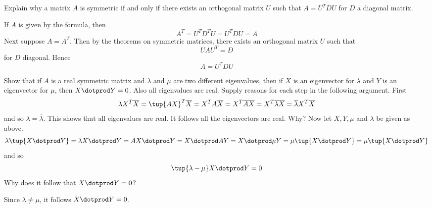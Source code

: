 \begin{enumialphparenastyle}
\begin{ex} Explain why a matrix $A$ is symmetric if and only if there exists an
orthogonal matrix $U$ such that $A=U^{T}DU$ for $D$ a diagonal matrix.
\begin{sol}
If $A$ is given by the formula, then
\[
A^{T}=U^{T}D^{T}U=U^{T}DU=A
\]
Next suppose $A=A^{T}$. Then by the theorems on symmetric matrices, there
exists an orthogonal matrix $U$ such that
\[
UAU^{T}=D
\]
for $D$ diagonal. Hence
\[
A=U^{T}DU
\]
\end{sol}
\end{ex}

\begin{ex} Show that if $A$ is a real symmetric matrix and 
$\lambda $ and $\mu $ are two different eigenvalues, then if $X$ is
an eigenvector for $\lambda $ and $Y$ is an eigenvector for $\mu $,
then $X\dotprod Y=0$. Also all eigenvalues are real. Supply reasons
for each step in the following argument. First 
\begin{equation*}
\lambda X^{T}\overline{X}=\tup{AX} ^{T}
\overline{X}=X^{T}A\overline{X}=X^{T}
\overline{AX}=X^{T}\overline{\lambda }\overline{X}
=\overline{\lambda }X^{T}\overline{X}
\end{equation*}
and so $\lambda =\overline{\lambda }$. This shows that all eigenvalues are
real. It follows all the eigenvectors are real. Why? Now let $X,Y
,\mu $ and $\lambda $ be given as above. \ 
\begin{equation*}
\lambda \tup{X\dotprod Y} =\lambda X\dotprod Y=AX\dotprod Y=X\dotprod AY=X\dotprod \mu Y=\mu \tup{
X\dotprod Y} =\mu \tup{X\dotprod Y}
\end{equation*}
and so 
\begin{equation*}
\tup{\lambda -\mu } X\dotprod Y=0
\end{equation*}
Why does it follow that $X\dotprod Y=0$?
\begin{sol}
Since $\lambda \neq \mu$, it follows $X \dotprod Y =0$.
\end{sol}
\end{ex}

\end{enumialphparenastyle}